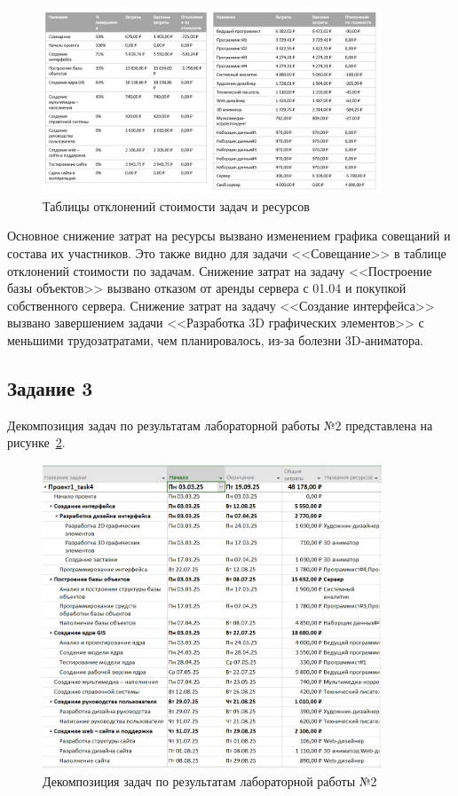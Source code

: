 \begin{figure}[H]
	\centering
	\includegraphics[width=0.9\textwidth]{img/lab5/screen4_3.jpg}
	\caption{Таблицы отклонений стоимости задач и ресурсов}
	\label{fig:5_screen8}
\end{figure}

Основное снижение затрат на ресурсы вызвано изменением графика совещаний и состава их участников.
Это также видно для задачи <<Совещание>> в таблице отклонений стоимости по задачам.
Снижение затрат на задачу <<Построение базы объектов>> вызвано отказом от аренды сервера с 01.04 и покупкой собственного сервера.
Снижение затрат на задачу <<Создание интерфейса>> вызвано завершением задачи <<Разработка 3D графических элементов>> с меньшими трудозатратами, чем планировалось, из-за болезни 3D-аниматора.

\subsection{Задание 3}

Декомпозиция задач по результатам лабораторной работы №2 представлена на рисунке~\ref{fig:5_screen9}.

\begin{figure}[H]
	\centering
	\includegraphics[width=0.9\textwidth]{img/lab5/screen5_1.jpg}
	\caption{Декомпозиция задач по результатам лабораторной работы №2}
	\label{fig:5_screen9}
\end{figure}

